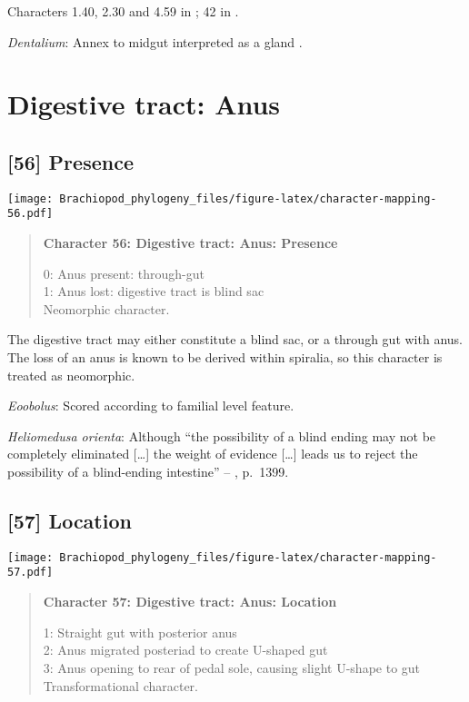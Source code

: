 \documentclass[openany]{book}
\theoremstyle{definition}
\theoremstyle{definition}
\theoremstyle{definition}
\theoremstyle{remark}
\begin{document}
Characters 1.40, 2.30 and 4.59 in \citet{SPS1996}; 42 in
\citet{Haszprunar2000}.

\hypertarget{Dentalium-coding-55}{}
\emph{Dentalium}: Annex to midgut interpreted as a gland
\citep{Smith2012M}.

\section{Digestive tract: Anus}\label{digestive-tract-anus}

\subsection*{{[}56{]} Presence}\label{presence-2}

\texttt{[image: Brachiopod\_phylogeny\_files/figure-latex/character-mapping-56.pdf]}

\begin{quote}
\textbf{Character 56: Digestive tract: Anus: Presence}

0: Anus present: through-gut\\
1: Anus lost: digestive tract is blind sac\\
Neomorphic character.
\end{quote}

The digestive tract may either constitute a blind sac, or a through gut
with anus. The loss of an anus is known to be derived within spiralia,
so this character is treated as neomorphic.

\hypertarget{Eoobolus-coding-56}{}
\emph{Eoobolus}: Scored according to familial level feature.

\hypertarget{Heliomedusa_orienta-coding-56}{}
\emph{Heliomedusa orienta}: Although ``the possibility of a blind ending
may not be completely eliminated {[}\ldots{}{]} the weight of evidence
{[}\ldots{}{]} leads us to reject the possibility of a blind-ending
intestine'' -- \citet{Zhang2007Rhynchonelliformeanbrachiopods}, p.~1399.

\subsection*{{[}57{]} Location}\label{location}

\texttt{[image: Brachiopod\_phylogeny\_files/figure-latex/character-mapping-57.pdf]}

\begin{quote}
\textbf{Character 57: Digestive tract: Anus: Location}

1: Straight gut with posterior anus\\
2: Anus migrated posteriad to create U-shaped gut\\
3: Anus opening to rear of pedal sole, causing slight U-shape to gut\\
Transformational character.
\end{quote}
\end{document}
